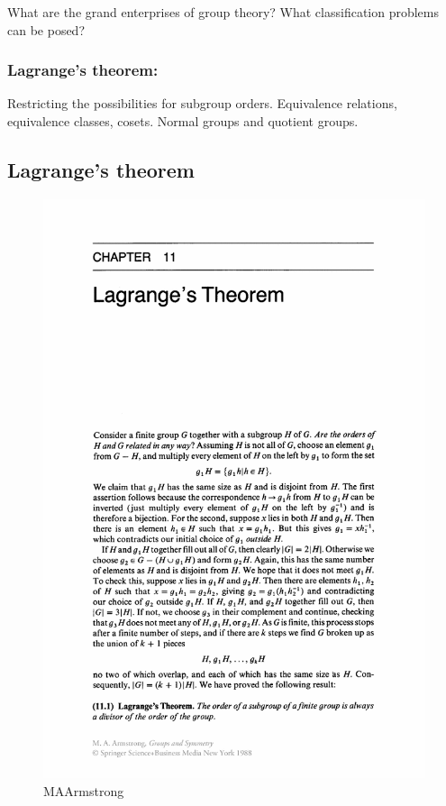 What are the grand enterprises of group theory? What classification
problems can be posed?

\subsubsection{Lagrange's theorem:}\label{lagranges-theorem}

Restricting the possibilities for subgroup orders. Equivalence
relations, equivalence classes, cosets. Normal groups and quotient
groups.

\subsection{Lagrange's theorem}\label{lagranges-theorem-1}

\begin{figure}[htbp]
\centering
\includegraphics{./MAA.png}
\caption{MAArmstrong}
\end{figure}

